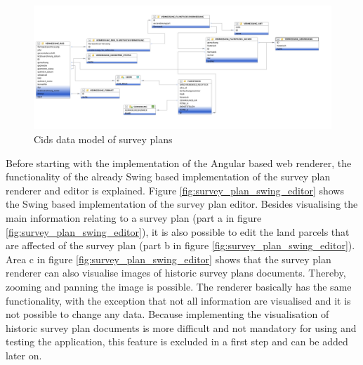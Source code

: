 \begin{figure}
	\centering	\includegraphics[width=1.0\textwidth]{./img/impl/surveyPlan_data_model.png}
	\caption{Cids data model of survey plans}
	\label{fig:survey_plan_data_model}
\end{figure}

Before starting with the implementation of the Angular based web renderer, the functionality of the already Swing based implementation of the survey plan renderer and editor is explained.
Figure \ref{fig:survey_plan_swing_editor} shows the Swing based implementation of the survey plan editor.
Besides visualising the main information relating to a survey plan (part a in figure \ref{fig:survey_plan_swing_editor}),  it is also possible to edit the land parcels that are affected of the survey plan (part b in figure \ref{fig:survey_plan_swing_editor}).
Area c in figure \ref{fig:survey_plan_swing_editor} shows that the survey plan renderer can also visualise images of historic survey plans documents.
Thereby, zooming and panning the image is possible.
The renderer basically has the same functionality, with the exception that not all information are visualised and it is not possible to change any data.
Because implementing the visualisation of historic survey plan documents is more difficult and not mandatory for using and testing the application, this feature is excluded in a first step and can be added later on.

